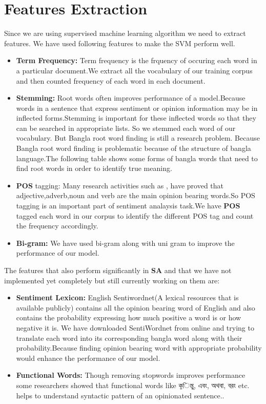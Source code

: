 \documentclass[a4paper,12pt]{report}
\begin{document}
\section{Features Extraction}
Since we are using supervised machine learning algorithm we need to extract features.
We have used following features to make the SVM  perform  well.
\begin{itemize}
    \item \textbf{Term Frequency:} Term frequency is the frquency of occuring each word in a particular document.We extract all the vocabulary of our training corpus and then counted frequency of each word in each document.
    \item \textbf {Stemming:} Root words often improves performance of a model.Because words in a sentence that express sentiment or opinion information may be in inflected forms.Stemming is important for these inflected words so that they can be searched in appropriate lists. So we stemmed each word of our vocabulary. But Bangla root word finding is still a research problem. Because Bangla root word finding is problematic because of the structure of bangla language.The following table shows some forms of bangla words that need to find root words in order to identify true meaning.
   \item \textbf{POS} tagging: Many research activities such as \citep{hatzivassiloglou2000effects},\citep{chesley2006using} have proved that adjective,adverb,noun and verb are the main opinion bearing words.So POS tagging is an important part of sentiment analaysis task.We have \textbf{POS} tagged each word in our corpus to identify the different POS tag and count the frequency accordingly.
   \item \textbf{Bi-gram:} We have used bi-gram along with uni gram  to improve the performance of our model.
   \end{itemize}

The features that also perform significantly in \textbf{SA} \citep{das2009subjectivity} and that we have not implemented yet completely  but still currently working on them are:

   \begin{itemize}
       \item \textbf{Sentiment Lexicon: } English Sentiwordnet(A lexical resources that is available publicly) contains all the opinion bearing word of English and also contains the probability expressing how much positive a word is or how negative it is. We have downloaded SentiWordnet from online and trying to translate each word into its corresponding bangla word along with their probability.Because finding opinion bearing word with appropriate probability would enhance the performance of our model.
       \item \textbf{Functional Words: }Though removing stopwords improves performance some researchers showed that functional words like {\b কিন্তু, এবং, অথবা, বরং etc.} helps to understand syntactic pattern of an opinionated  sentence.\citep{das2010opinion}.
   \end{itemize}
    
\end{document}
